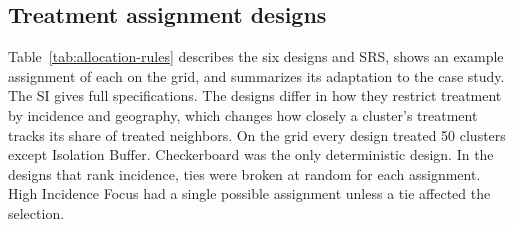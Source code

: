 \documentclass[Afour,sagev,times]{sagej}
\begin{document}
\subsection{Treatment assignment designs}
Table~\ref{tab:allocation-rules} describes the six designs and SRS, shows an example assignment of each on the grid, and summarizes its adaptation to the case study. The SI gives full specifications. The designs differ in how they restrict treatment by incidence and geography, which changes how closely a cluster's treatment tracks its share of treated neighbors. On the grid every design treated 50 clusters except Isolation Buffer. Checkerboard was the only deterministic design. In the designs that rank incidence, ties were broken at random for each assignment. High Incidence Focus had a single possible assignment unless a tie affected the selection.
\ifctjreading
\CTJDesignTable
\fi
\end{document}
